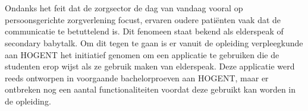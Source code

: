 
%
%
%
%
%

%



\chapter*{}

Ondanks het feit dat de zorgsector de dag van vandaag vooral op persoonsgerichte zorgverlening focust, ervaren oudere patiënten vaak dat de communicatie te betuttelend is. Dit fenomeen staat bekend als elderspeak of secondary babytalk. Om dit tegen te gaan is er vanuit de opleiding verpleegkunde aan HOGENT het initiatief genomen om een applicatie te gebruiken die de studenten erop wijst als ze gebruik maken van elderspeak. Deze applicatie werd reeds ontworpen in voorgaande bachelorproeven aan HOGENT, maar er ontbreken nog een aantal functionaliteiten voordat deze gebruikt kan worden in de opleiding.

